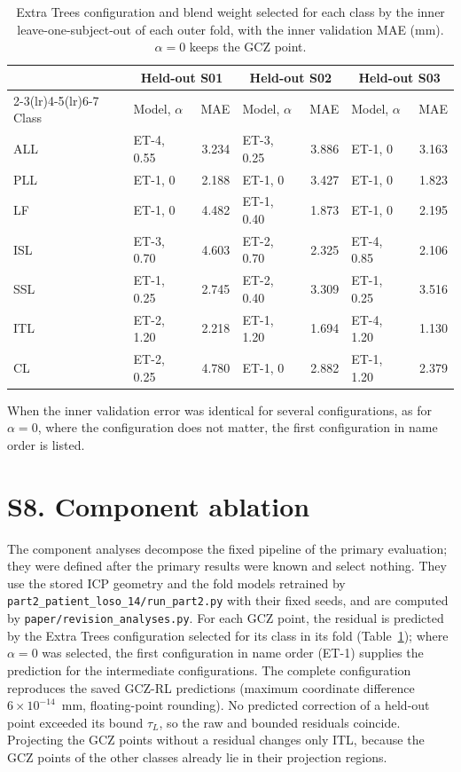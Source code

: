 \documentclass[10pt,a4paper]{article}
\newif\ifhighlight
\newcommand{\revstart}{\ifhighlight\begingroup\color{revcolor}\fi}
\begin{document}
\begin{table}[h]
\centering
\small
\caption{Extra Trees configuration and blend weight selected for each class by the inner leave-one-subject-out of each outer fold, with the inner validation MAE (mm). $\alpha=0$ keeps the GCZ point.}
\label{tab:selected}
\begin{tabular}{@{}llrlrlr@{}}
\toprule
 & \multicolumn{2}{c}{Held-out S01} & \multicolumn{2}{c}{Held-out S02} & \multicolumn{2}{c}{Held-out S03} \\
\cmidrule(lr){2-3}\cmidrule(lr){4-5}\cmidrule(lr){6-7}
Class & Model, $\alpha$ & MAE & Model, $\alpha$ & MAE & Model, $\alpha$ & MAE \\
\midrule
ALL & ET-4, 0.55 & 3.234 & ET-3, 0.25 & 3.886 & ET-1, 0 & 3.163 \\
PLL & ET-1, 0 & 2.188 & ET-1, 0 & 3.427 & ET-1, 0 & 1.823 \\
LF & ET-1, 0 & 4.482 & ET-1, 0.40 & 1.873 & ET-1, 0 & 2.195 \\
ISL & ET-3, 0.70 & 4.603 & ET-2, 0.70 & 2.325 & ET-4, 0.85 & 2.106 \\
SSL & ET-1, 0.25 & 2.745 & ET-2, 0.40 & 3.309 & ET-1, 0.25 & 3.516 \\
ITL & ET-2, 1.20 & 2.218 & ET-1, 1.20 & 1.694 & ET-4, 1.20 & 1.130 \\
CL & ET-2, 0.25 & 4.780 & ET-1, 0 & 2.882 & ET-1, 1.20 & 2.379 \\
\bottomrule
\end{tabular}
\end{table}

When the inner validation error was identical for several configurations, as for $\alpha=0$, where the configuration does not matter, the first configuration in name order is listed.

\revstart
\section*{S8. Component ablation}

The component analyses decompose the fixed pipeline of the primary evaluation; they were defined after the primary results were known and select nothing. They use the stored ICP geometry and the fold models retrained by \texttt{part2\_patient\_loso\_14/run\_part2.py} with their fixed seeds, and are computed by \texttt{paper/revision\_analyses.py}. For each GCZ point, the residual is predicted by the Extra Trees configuration selected for its class in its fold (Table~\ref{tab:selected}); where $\alpha=0$ was selected, the first configuration in name order (ET-1) supplies the prediction for the intermediate configurations. The complete configuration reproduces the saved GCZ-RL predictions (maximum coordinate difference $6\times10^{-14}$~mm, floating-point rounding). No predicted correction of a held-out point exceeded its bound $\tau_L$, so the raw and bounded residuals coincide. Projecting the GCZ points without a residual changes only ITL, because the GCZ points of the other classes already lie in their projection regions.
\end{document}
